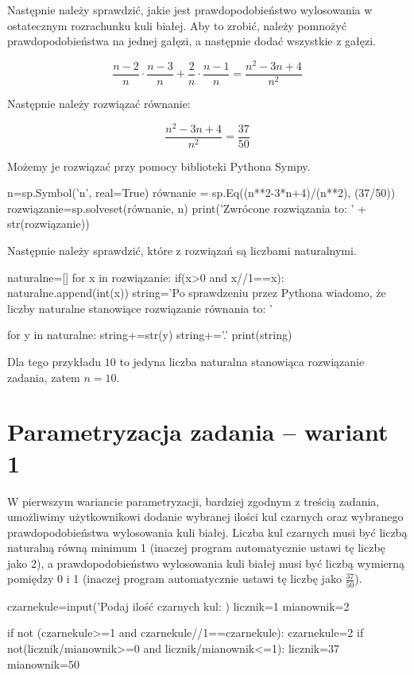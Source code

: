 \documentclass{mwart}
\begin{document}
Następnie należy sprawdzić, jakie jest prawdopodobieństwo wylosowania w ostatecznym rozrachunku kuli białej. Aby to zrobić, należy pomnożyć prawdopodobieństwa na jednej gałęzi, a następnie dodać wszystkie z gałęzi.

\begin{equation}
\frac{n-2}{n}\cdot\frac{n-3}{n}+\frac{2}{n}\cdot\frac{n-1}{n} = \frac{n^2-3n+4}{n^2}
\end{equation}

Następnie należy rozwiązać równanie:

\begin{equation}
\frac{n^2-3n+4}{n^2} = \frac{37}{50}
\end{equation}

Możemy je rozwiązać przy pomocy biblioteki Pythona Sympy.
\begin{pycode}
n=sp.Symbol('n', real=True)
równanie = sp.Eq((n**2-3*n+4)/(n**2), (37/50))
rozwiązanie=sp.solveset(równanie, n)
print('Zwrócone rozwiązania to: ' + str(rozwiązanie))
\end{pycode}

Następnie należy sprawdzić, które z rozwiązań są liczbami naturalnymi.

\begin{pycode}
naturalne=[]
for x in rozwiązanie:
	if(x>0 and x//1==x):
		naturalne.append(int(x))
string='Po sprawdzeniu przez Pythona wiadomo, że liczby naturalne stanowiące rozwiązanie równania to: '

for y in naturalne:
	string+=str(y)
string+='.'
print(string)
\end{pycode}

Dla tego przykładu $10$ to jedyna liczba naturalna stanowiąca rozwiązanie zadania, zatem $n = 10$.

\section{Parametryzacja zadania – wariant 1}
W pierwszym wariancie parametryzacji, bardziej zgodnym z treścią zadania, umożliwimy użytkownikowi dodanie wybranej ilości kul czarnych oraz wybranego prawdopodobieństwa wylosowania kuli białej. Liczba kul czarnych musi być liczbą naturalną równą minimum 1 (inaczej program automatycznie ustawi tę liczbę jako 2), a prawdopodobieństwo wylosowania kuli białej musi być liczbą wymierną pomiędzy 0 i 1 (inaczej program automatycznie ustawi tę liczbę jako $\frac{37}{50}$).

\begin{pycode}
czarnekule=input('Podaj ilość czarnych kul: )
licznik=1
mianownik=2


if not (czarnekule>=1 and czarnekule//1==czarnekule):
	czarnekule=2
if not(licznik/mianownik>=0 and licznik/mianownik<=1):
	licznik=37
	mianownik=50

\end{pycode}
\end{document}
